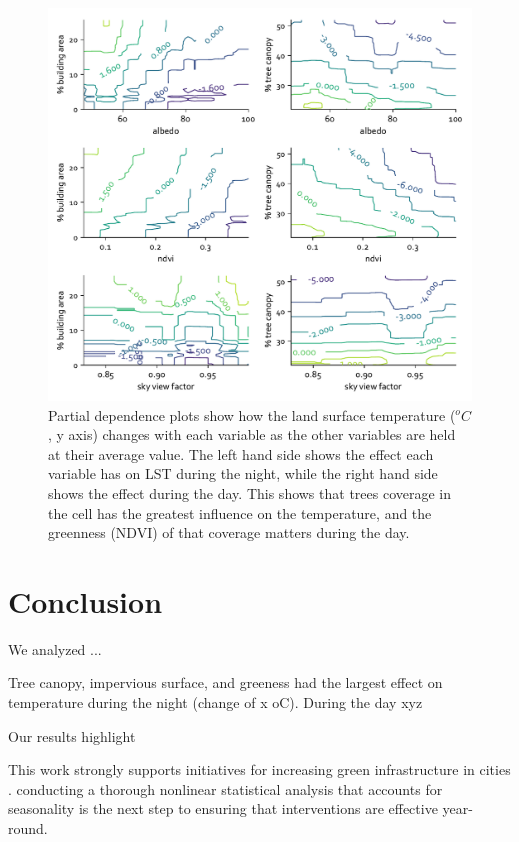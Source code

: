 \documentclass[final,3p,times,twocolumn,sort&compress]{elsarticle}
\begin{document}
\begin{figure}
    \centering
    \includegraphics[width=\linewidth]{fig/report/pdp_2d_day_500.pdf}
    \caption{
    Partial dependence plots show how the land surface temperature ($^oC$, y axis) changes with each variable as the other variables are held at their average value. The left hand side shows the effect each variable has on LST during the night, while the right hand side shows the effect during the day. This shows that trees coverage in the cell has the greatest influence on the temperature, and the greenness (NDVI) of that coverage matters during the day.
    }
    \label{fig:pdp_2dday_500}
\end{figure}






\section{Conclusion}

We analyzed ...

Tree canopy, impervious surface, and greeness had the largest effect on temperature during the night (change of x oC).
During the day xyz

Our results highlight 

This work strongly supports initiatives for increasing green infrastructure in cities \cite{Larsen2015-da, Meerow2017-xv}. 
conducting a thorough nonlinear statistical analysis that accounts for seasonality is the next step to ensuring that interventions are effective year-round.
\end{document}
